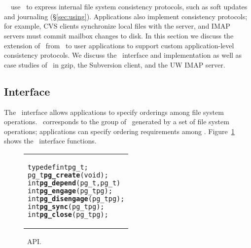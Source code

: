 \section{\Opgroups}
\label{sec:opgroup}

\newcommand{\opgroupCreate}{\texttt{pg\_create()}}
\newcommand{\opgroupAddDepend}{\texttt{pg\_depend()}}
\newcommand{\opgroupEngage}{\texttt{pg\_engage()}}
\newcommand{\opgroupDisengage}{\texttt{pg\_disengage()}}
\newcommand{\opgroupRelease}{\texttt{pg\_release()}}
\newcommand{\opgroupSync}{\texttt{pg\_sync()}}
\newcommand{\opgroupAbandon}{\texttt{pg\_close()}}

\Kudos\ \modules\ use \chdescs\ to express internal file system
consistency protocols, such as soft updates and journaling
(\S\ref{sec:using}).
%
Applications also implement consistency protocols; for example, CVS
clients synchronize local files with the server, and IMAP servers
must commit mailbox changes to disk. In this section we discuss the
extension of \chdescs\ from \Kudos\ to user applications to support
custom application-level consistency protocols. We discuss the
\opgroup\ interface and implementation as well as case studies of \opgroups\
in gzip, the Subversion client, and the UW IMAP server.

\subsection{Interface}
\label{sec:opgroup:interface}

The \opgroup\ interface allows applications to specify orderings among
file system operations.
%
\Anopgroup\ corresponds to the group of \chdescs\ generated by a set
of file system operations; applications can specify ordering
requirements among \opgroups.
%
Figure~\ref{fig:opgroup-interface} shows the \opgroup\ interface
functions.

\begin{figure}[htb]
\vskip-14pt
\begin{tabular}{@{\hskip0.22in}p{2in}@{}}
\begin{scriptsize}
\begin{alltt}
typedef int pg_t;
pg_t \textbf{pg_create}(void);
int  \textbf{pg_depend}(pg_t \after, pg_t \before)
int  \textbf{pg_engage}(pg_t pg);
int  \textbf{pg_disengage}(pg_t pg);
int  \textbf{pg_sync}(pg_t pg);
int  \textbf{pg_close}(pg_t pg);
\end{alltt}
\end{scriptsize}
\end{tabular}
\vspace{-10pt}
\caption{\label{fig:opgroup-interface} \Opgroup\ API.}
\end{figure}

